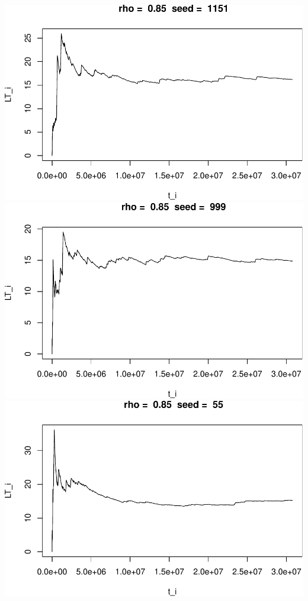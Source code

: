 \documentclass[]{article}
\begin{document}
\includegraphics{003_files/figure-latex/unnamed-chunk-20-4.pdf}
\includegraphics{003_files/figure-latex/unnamed-chunk-20-5.pdf}
\includegraphics{003_files/figure-latex/unnamed-chunk-20-6.pdf}
\end{document}
